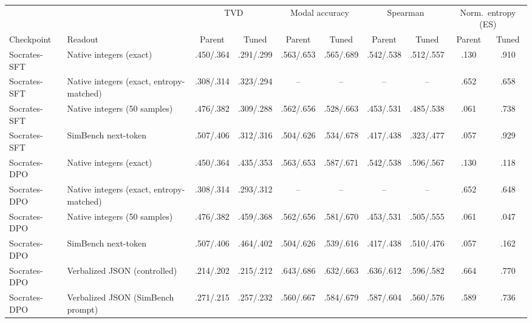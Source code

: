 \begin{table}[t]
\centering\scriptsize
\setlength{\tabcolsep}{4pt}
\begin{tabular}{@{}llcccccccc@{}}
\toprule
& & \multicolumn{2}{c}{TVD} & \multicolumn{2}{c}{Modal accuracy} & \multicolumn{2}{c}{Spearman} & \multicolumn{2}{c}{Norm.\ entropy (ES)} \\
\cmidrule(lr){3-4}\cmidrule(lr){5-6}\cmidrule(lr){7-8}\cmidrule(l){9-10}
Checkpoint & Readout & Parent & Tuned & Parent & Tuned & Parent & Tuned & Parent & Tuned \\
\midrule
Socrates-SFT & Native integers (exact) & .450/.364 & .291/.299 & .563/.653 & .565/.689 & .542/.538 & .512/.557 & .130 & .910 \\
Socrates-SFT & Native integers (exact, entropy-matched) & .308/.314 & .323/.294 & -- & -- & -- & -- & .652 & .658 \\
Socrates-SFT & Native integers (50 samples) & .476/.382 & .309/.288 & .562/.656 & .528/.663 & .453/.531 & .485/.538 & .061 & .738 \\
Socrates-SFT & SimBench next-token & .507/.406 & .312/.316 & .504/.626 & .534/.678 & .417/.438 & .323/.477 & .057 & .929 \\
Socrates-DPO & Native integers (exact) & .450/.364 & .435/.353 & .563/.653 & .587/.671 & .542/.538 & .596/.567 & .130 & .118 \\
Socrates-DPO & Native integers (exact, entropy-matched) & .308/.314 & .293/.312 & -- & -- & -- & -- & .652 & .648 \\
Socrates-DPO & Native integers (50 samples) & .476/.382 & .459/.368 & .562/.656 & .581/.670 & .453/.531 & .505/.555 & .061 & .047 \\
Socrates-DPO & SimBench next-token & .507/.406 & .464/.402 & .504/.626 & .539/.616 & .417/.438 & .510/.476 & .057 & .162 \\
Socrates-DPO & Verbalized JSON (controlled) & .214/.202 & .215/.212 & .643/.686 & .632/.663 & .636/.612 & .596/.582 & .664 & .770 \\
Socrates-DPO & Verbalized JSON (SimBench prompt) & .271/.215 & .257/.232 & .560/.667 & .584/.679 & .587/.604 & .560/.576 & .589 & .736 \\
\bottomrule
\end{tabular}

\end{table}
